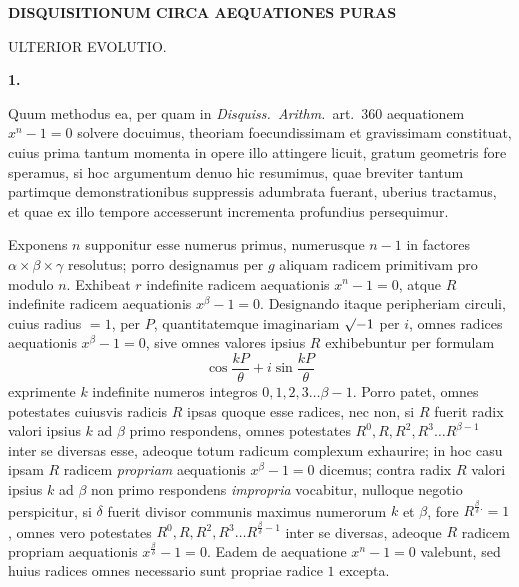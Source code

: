 \par\bigskip{}
\begin{center}\large\bfseries DISQUISITIONUM CIRCA AEQUATIONES PURAS\par\medskip ULTERIOR EVOLUTIO.\end{center}
\renewcommand{\BookRunningTitle}{Nachlass. Disquisitionum circa aequationes puras}
\renewcommand{\Article}[1]{\par\medskip\Needspace{4\baselineskip}\pdfbookmark[1]{Art. #1}{purae-art-#1}\centerline{\textbf{#1.}}\nobreak\smallskip}

\Article{1}
Quum methodus ea, per quam in \emph{Disquiss.\ Arithm.}\ art.\ 360 aequationem $x^n-1=0$ solvere docuimus, theoriam foecundissimam et gravissimam constituat, cuius prima tantum momenta in opere illo attingere licuit, gratum geometris fore speramus, si hoc argumentum denuo hic resumimus, quae breviter tantum partimque demonstrationibus suppressis adumbrata fuerant, uberius tractamus, et quae ex illo tempore accesserunt incrementa profundius persequimur.

Exponens $n$ supponitur esse numerus primus, numerusque $n-1$ in factores $\alpha\times\beta\times\gamma$ resolutus; porro designamus per $g$ aliquam radicem primitivam pro modulo $n$. Exhibeat $r$ indefinite radicem aequationis $x^n-1=0$, atque $R$ indefinite radicem aequationis $x^\beta-1=0$. Designando itaque peripheriam circuli, cuius radius $=1$, per $P$, quantitatemque imaginariam $\mathord{\surd}{-1}$ per $i$, omnes radices aequationis $x^\beta-1=0$, sive omnes valores ipsius $R$ exhibebuntur per formulam
\[
\cos\frac{kP}{\theta}+i\sin\frac{kP}{\theta}
\]
exprimente $k$ indefinite numeros integros $0,1,2,3\ldots\beta-1$. Porro patet, omnes potestates cuiusvis radicis $R$ ipsas quoque esse radices, nec non, si $R$ fuerit radix valori ipsius $k$ ad $\beta$ primo respondens, omnes potestates $R^0,R,R^2,R^3\ldots R^{\beta-1}$ inter se diversas esse, adeoque totum radicum complexum exhaurire; in hoc casu ipsam $R$ radicem \emph{propriam} aequationis $x^\beta-1=0$ dicemus; contra radix $R$ 
valori ipsius $k$ ad $\beta$ non primo respondens \emph{impropria} vocabitur, nulloque negotio perspicitur, si $\delta$ fuerit divisor communis maximus numerorum $k$ et $\beta$, fore $R^{\frac\beta\delta .}=1$, omnes vero potestates $R^0,R,R^2,R^3\ldots R^{\frac\beta\delta-1}$ inter se diversas, adeoque $R$ radicem propriam aequationis $x^{\frac\beta\delta}-1=0$. Eadem de aequatione $x^n-1=0$ valebunt, sed huius radices omnes necessario sunt propriae radice $1$ excepta.

